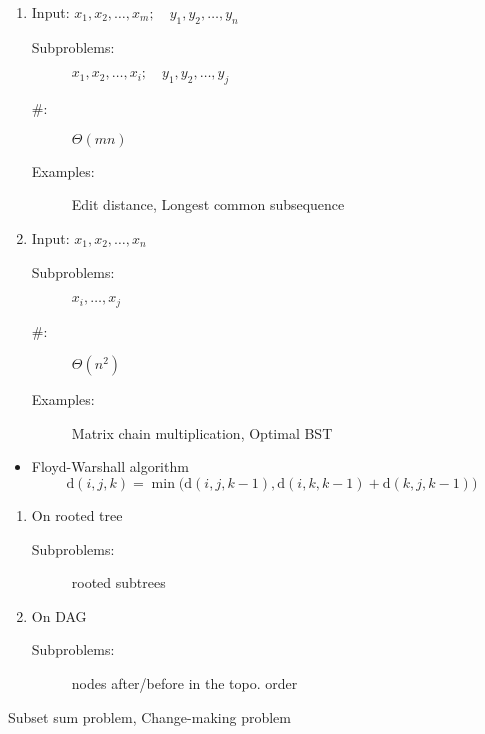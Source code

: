 \begin{frame}{}
  \centerline{}

  \vspace{0.50cm}
  \begin{enumerate}
    \item Input: $x_{1}, x_{2}, \dots, x_{m}; \quad y_{1}, y_{2}, \dots, y_{n}$
      \begin{description}
	\item[Subproblems:] $x_{1}, x_{2}, \dots, x_{i}; \quad y_{1}, y_{2}, \dots, y_{j}$
	\item[\#:] $\Theta(mn)$
	\item[Examples:] Edit distance, Longest common subsequence
      \end{description}
      \pause
      \vspace{0.30cm}
    \item Input: $x_{1}, x_{2}, \dots, x_{n}$
      \begin{description}
	\item[Subproblems:] $x_{i}, \dots, x_{j}$
	\item[\#:] $\Theta(n^{2})$
	\item[Examples:] Matrix chain multiplication, Optimal BST
      \end{description}
  \end{enumerate}
\end{frame}
\begin{frame}{}
  \centerline{}

  \vspace{0.50cm}
  \begin{itemize}
    \item Floyd-Warshall algorithm
      \[
	\text{d}(i,j,k) = \min \Big(\text{d}(i,j,k-1), \text{d}(i,k,k-1) + \text{d}(k,j,k-1)\Big)
      \]
  \end{itemize}

  \pause
  \centerline{}
  \begin{enumerate}
    \item On rooted tree
      \begin{description}
	\item[Subproblems:] rooted subtrees
      \end{description}
    \item On DAG
      \begin{description}
	\item[Subproblems:] nodes after/before in the topo. order
      \end{description}
  \end{enumerate}

  \pause
  \vspace{0.30cm}
  \centerline{}
  \centerline{Subset sum problem, Change-making problem}
\end{frame}


